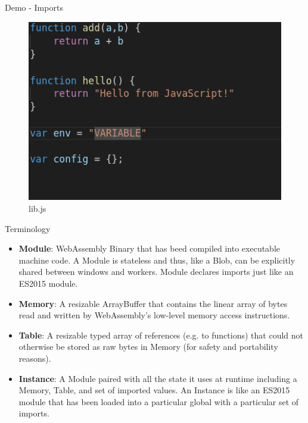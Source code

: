 \documentclass{beamer}
\begin{document}
\begin{frame}{Demo - Imports}
\begin{figure}
    \includegraphics[scale=0.4]{./images/libjs.png}
    \caption{lib.js}
\end{figure}

\end{frame}

\begin{frame}{Terminology}
\begin{itemize} 
    \item \textbf{Module}: WebAssembly Binary that has beed compiled into executable machine code. A Module is stateless and thus, like a Blob, can be explicitly shared between windows and workers. Module declares imports just like an ES2015 module.
    \item \textbf{Memory}: A resizable ArrayBuffer that contains the linear array of bytes read and written by WebAssembly’s low-level memory access instructions.
    \item \textbf{Table}: A resizable typed array of references (e.g. to functions) that could not otherwise be stored as raw bytes in Memory (for safety and portability reasons).
    \item \textbf{Instance}: A Module paired with all the state it uses at runtime including a Memory, Table, and set of imported values. An Instance is like an ES2015 module that has been loaded into a particular global with a particular set of imports.
\end{itemize}
\end{frame}
\end{document}
